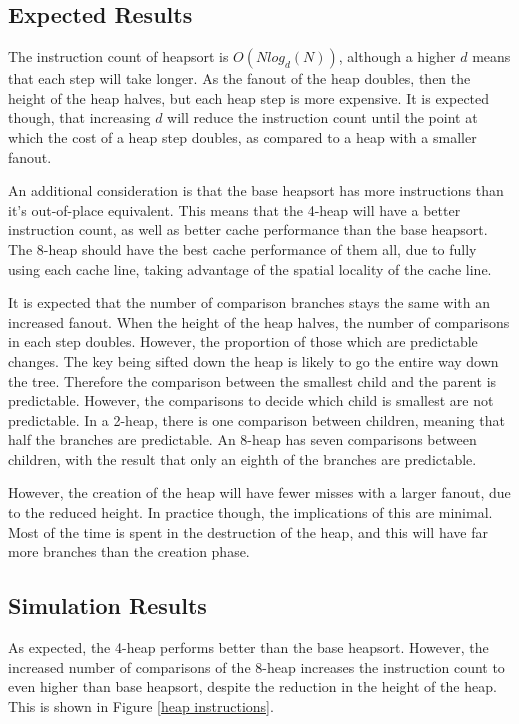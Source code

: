 \subsection{Expected Results}
The instruction count of heapsort is $O(Nlog_d(N))$, although a higher $d$ means
that each step will take longer. As the fanout of the heap doubles, then the
height of the heap halves, but each heap step is more expensive. It is expected
though, that increasing $d$ will reduce the instruction count until the point at
which the cost of a heap step doubles, as compared to a heap with a smaller
fanout.

An additional consideration is that the base heapsort has more instructions than
it's out-of-place equivalent. This means that the 4-heap will have a better
instruction count, as well as better cache performance than the base heapsort.
The 8-heap should have the best cache performance of them all, due to fully
using each cache line, taking advantage of the spatial locality of the cache
line.

It is expected that the number of comparison branches stays the same with
an increased fanout. When the height of the heap halves, the number of
comparisons in each step doubles. However, the proportion of those which are
predictable changes. The key being sifted down the heap is likely to go the
entire way down the tree. Therefore the comparison between the smallest child
and the parent is predictable. However, the comparisons to decide which child is
smallest are not predictable. In a 2-heap, there is one comparison between
children, meaning that half the branches are predictable. An 8-heap has seven
comparisons between children, with the result that only an eighth of the branches
are predictable.

However, the creation of the heap will have fewer misses with a larger fanout,
due to the reduced height. In practice though, the implications of this are
minimal. Most of the time is spent in the destruction of the heap, and this will
have far more branches than the creation phase.

\subsection{Simulation Results}


As expected, the 4-heap performs better than the base heapsort. However, the
increased number of comparisons of the 8-heap increases the instruction count to
even higher than base heapsort, despite the reduction in the height of the heap.
This is shown in Figure \ref{heap instructions}.

